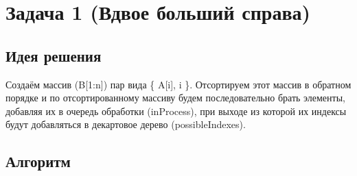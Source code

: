 \section{Задача 1 (Вдвое больший справа)}
\subsection{Идея решения}
Создаём массив (B[1:n]) пар вида \{ A[i], i \}. Отсортируем этот массив в обратном порядке и по отсортированному массиву будем последовательно брать элементы, добавляя их в очередь обработки (inProcess), при выходе из которой их индексы будут добавляться в декартовое дерево (possibleIndexes).

\subsection{Алгоритм}

